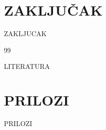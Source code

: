 \documentclass[12pt,a4paper]{article}
\begin{document}
\section{ZAKLJUČAK}
{{ZAKLJUCAK}}

\newpage
\begin{thebibliography}{99}
{{LITERATURA}}
\end{thebibliography}

\newpage
\section*{PRILOZI}
{{PRILOZI}}
\end{document}

